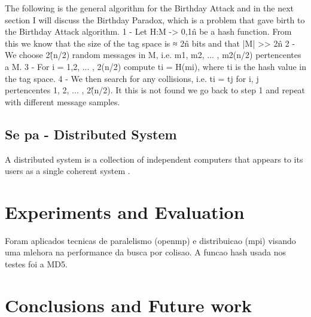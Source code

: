 \documentclass[12pt]{article}
\begin{document}
The following is the general algorithm for the Birthday Attack and in the next section I will discuss
the Birthday Paradox, which is a problem that gave birth to the Birthday Attack algorithm.
1 - Let H:M -> {0,1}\^n be a hash function. From this we know that the size of the tag space is ≈ 2\^n bits
and that |M| >> 2\^n
2 - We choose 2\^(n/2) random messages in M, i.e. m1, m2, ... , m2(n/2) pertencentes a M.
3 - For i = 1,2, ... , 2(n/2) compute ti = H(mi), where ti is the hash value in the tag space.
4 - We then search for any collisions, i.e. ti = tj for i, j pertencentes {1, 2, ... , 2\^(n/2)}. It this is not
found we go back to step 1 and repeat with different message samples.

\subsection{Se pa - Distributed System}
A distributed system is a collection of independent computers that appears to its users as a single 
coherent system \cite{tanenbaum2002distributed}.
 
\section{Experiments and Evaluation}

Foram aplicados tecnicas de paralelismo (openmp) e distribuicao (mpi) visando uma mlehora na performance
da busca por colisao. A funcao hash usada nos testes foi a MD5.

\section{Conclusions and Future work}



\end{document}
